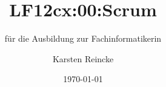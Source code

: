 \documentclass[]{beamer}
\title{LF12cx:00:Scrum}
\subtitle{für die Ausbildung zur Fachinformatikerin}
\institute{GS-LDK}
\author{Karsten Reincke}
\date{\today}
\def\cfgGl{../../../cfg.gl/}
\begin{document}

\begin{frame}
  \titlepage
\end{frame}






\logo{}
\newpage




\end{document}
